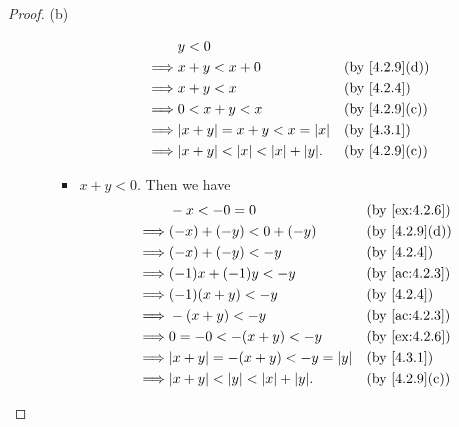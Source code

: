 \begin{proof}{(b)}
\begin{itemize}
\begin{itemize}
\begin{itemize}
				                  \begin{align*}
					                           & y < 0                                                                       \\
					                  \implies & x + y < x + 0                              &  & \text{(by \cref{4.2.9}(d))} \\
					                  \implies & x + y < x                                  &  & \by{4.2.4}                  \\
					                  \implies & 0 < x + y < x                              &  & \text{(by \cref{4.2.9}(c))} \\
					                  \implies & \abs{x + y} = x + y < x = \abs{x}          &  & \by{4.3.1}                  \\
					                  \implies & \abs{x + y} < \abs{x} < \abs{x} + \abs{y}. &  & \text{(by \cref{4.2.9}(c))}
				                  \end{align*}
				            \item \(x + y < 0\).
				                  Then we have
				                  \begin{align*}
					                           & -x < -0 = 0                                &  & \by{ex:4.2.6}               \\
					                  \implies & (-x) + (-y) < 0 + (-y)                     &  & \text{(by \cref{4.2.9}(d))} \\
					                  \implies & (-x) + (-y) < -y                           &  & \by{4.2.4}                  \\
					                  \implies & (-1)x + (-1)y < -y                         &  & \by{ac:4.2.3}               \\
					                  \implies & (-1)(x + y) < -y                           &  & \by{4.2.4}                  \\
					                  \implies & -(x + y) < -y                              &  & \by{ac:4.2.3}               \\
					                  \implies & 0 = -0 < -(x + y) < -y                     &  & \by{ex:4.2.6}               \\
					                  \implies & \abs{x + y} = -(x + y) < -y = \abs{y}      &  & \by{4.3.1}                  \\
					                  \implies & \abs{x + y} < \abs{y} < \abs{x} + \abs{y}. &  & \text{(by \cref{4.2.9}(c))}
				                  \end{align*}

\end{itemize}
\end{itemize}
\end{itemize}
\end{proof}
